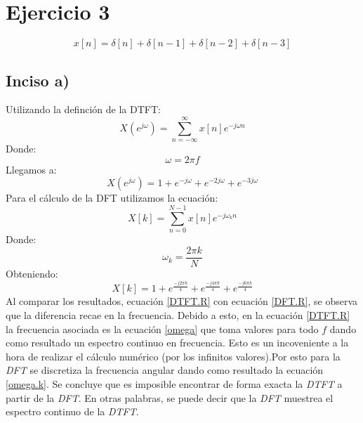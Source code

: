 \documentclass[letterpaper]{article}
\begin{document}
\section{Ejercicio 3}
\begin{equation}
    x[n]=\delta[n]+\delta[n-1]+\delta[n-2]+\delta[n-3]
\end{equation}
\subsection*{Inciso a)}
Utilizando la definción de la DTFT:
\begin{equation}
    X(e^{j\omega})=\sum_{n=-\infty}^{\infty}x[n]e^{-j\omega n}
\end{equation}
Donde:
\begin{equation}
    \label{omega}
    \omega=2\pi f
\end{equation}
Llegamos a:
\begin{equation}
    \label{DTFT.R}
    X(e^{j\omega})=1+e^{-j\omega}+e^{-2j\omega}+e^{-3j\omega}
\end{equation}
Para el cálculo de la DFT utilizamos la ecuación:
\begin{equation}
    X[k]=\sum_{n=0}^{N-1}x[n]e^{-j\omega_k n}
\end{equation}
Donde:
\begin{equation}
    \label{omega.k}
    \omega_k=\frac{2\pi k}{N}
\end{equation}
Obteniendo:
\begin{equation}
    \label{DFT.R}
    X[k]=1+e^{\frac{-j2\pi k }{4}}+e^{\frac{-j4\pi k}{4}}+e^{\frac{-j6\pi k}{4}}
\end{equation}
Al comparar los resultados, ecuación \ref{DTFT.R} con ecuación \ref{DFT.R}, se observa que la diferencia recae en la frecuencia. Debido a esto, en la ecuación 
\ref{DTFT.R} la frecuencia asociada es la ecuación \ref{omega} que toma valores para todo $f$ dando como resultado un espectro continuo en frecuencia. Esto es un incoveniente a la hora 
de realizar el cálculo numérico (por los infinitos valores).Por esto para la \textit{DFT} se discretiza la frecuencia angular dando como resultado la ecuación \ref{omega.k}. Se concluye que es imposible encontrar de forma exacta la \textit{DTFT} a partir de la \textit{DFT}. En otras palabras, se puede decir que 
la \textit{DFT} muestrea el espectro continuo de la \textit{DTFT}.
\end{document}

